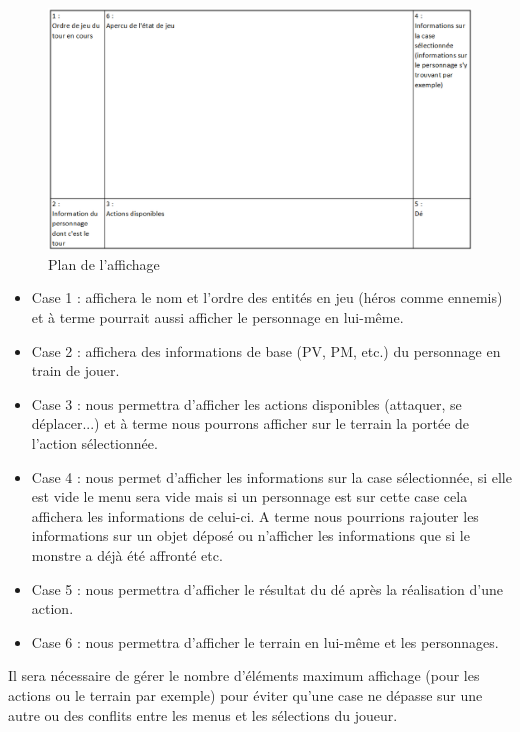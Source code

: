 \documentclass[a4paper,12pt]{article}
\begin{document}
\begin{figure}[hbt!]
    \centering
    \includegraphics[scale=0.7, angle=0]{images/plan.png}
    \caption{Plan de l'affichage}
    \label{fig:plan}
\end{figure}

\begin{itemize}
    \item Case 1 : affichera le nom et l'ordre des entités en jeu (héros comme ennemis) et à terme pourrait aussi afficher le personnage en lui-même.
    \item Case 2 : affichera des informations de base (PV, PM, etc.) du personnage en train de jouer.
    \item Case 3 : nous permettra d'afficher les actions disponibles (attaquer, se déplacer...) et à terme nous pourrons afficher sur le terrain la portée de l'action sélectionnée. 
    \item Case 4 : nous permet d'afficher les informations sur la case sélectionnée, si elle est vide le menu sera vide mais si un personnage est sur cette case cela affichera les informations de celui-ci. A terme nous pourrions rajouter les informations sur un objet déposé ou n'afficher les informations que si le monstre a déjà été affronté etc.
    \item Case 5 : nous permettra d'afficher le résultat du dé après la réalisation d'une action.
    \item Case 6 : nous permettra d'afficher le terrain en lui-même et les personnages.
\end{itemize}

Il sera nécessaire de gérer le nombre d'éléments maximum affichage (pour les actions ou le terrain par exemple) pour éviter qu'une case ne dépasse sur une autre ou des conflits entre les menus et les sélections du joueur.
\end{document}
